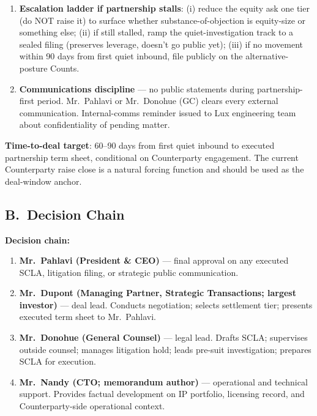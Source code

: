 \documentclass[11pt,letterpaper]{article}
\begin{document}
\begin{enumerate}[leftmargin=1.5em,itemsep=0.1em]
joint GTM, co-branding, ATS/BD/TA reciprocal license) is
substantively load-bearing, not aesthetic. Each item is what gives
the deal forward operating value to Lux beyond the equity stake
itself.
\item \textbf{Escalation ladder if partnership stalls}: (i) reduce
the equity ask one tier (do NOT raise it) to surface whether
substance-of-objection is equity-size or something else; (ii) if
still stalled, ramp the quiet-investigation track to a sealed
filing (preserves leverage, doesn't go public yet); (iii) if no
movement within 90 days from first quiet inbound, file publicly
on the alternative-posture Counts.
\item \textbf{Communications discipline} --- no public statements
during partnership-first period. Mr.\ Pahlavi or Mr.\ Donohue (GC)
clears every external communication. Internal-comms reminder
issued to Lux engineering team about confidentiality of pending
matter.
\end{enumerate}

\textbf{Time-to-deal target}: 60--90 days from first quiet inbound
to executed partnership term sheet, conditional on Counterparty
engagement. The current Counterparty raise close is a natural
forcing function and should be used as the deal-window anchor.

\subsection*{B.\ Decision Chain}

\textbf{Decision chain:}

\begin{enumerate}[leftmargin=1.5em,itemsep=0.1em]
\item \textbf{Mr.\ Pahlavi (President \& CEO)} --- final approval
on any executed SCLA, litigation filing, or strategic public
communication.
\item \textbf{Mr.\ Dupont (Managing Partner, Strategic Transactions;
largest investor)} --- deal lead. Conducts negotiation; selects
settlement tier; presents executed term sheet to Mr.\ Pahlavi.
\item \textbf{Mr.\ Donohue (General Counsel)} --- legal lead.
Drafts SCLA; supervises outside counsel; manages litigation hold;
leads pre-suit investigation; prepares SCLA for execution.
\item \textbf{Mr.\ Nandy (CTO; memorandum author)} --- operational and
technical support. Provides factual development on IP portfolio,
licensing record, and Counterparty-side operational context.
\end{enumerate}
\end{document}
